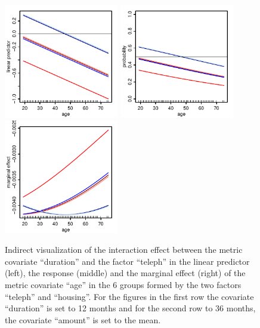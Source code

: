 \documentclass[nojss]{jss}
\newcommand{\quotes}[1]{``#1''}
\begin{document}
\begin{figure}[H]
\includegraphics[width=5cm]{cd-age-link-2-001} \includegraphics[width=5cm]{cd-age-resp-2-001} \includegraphics[width=5cm]{cd-age-marg-2-001}
\caption{Indirect visualization of the interaction effect between the metric covariate \quotes{duration} and the factor \quotes{teleph} in the linear predictor (left), the response (middle) and the marginal effect (right) of the metric covariate \quotes{age} in the 6 groups formed by the two factors \quotes{teleph} and \quotes{housing}. For the figures in the first row the covariate \quotes{duration} is set to 12 months and for the second row to 36 months, the covariate \quotes{amount} is set to the mean.} \label{fig-cd-age-1}
\end{figure}
\end{document}
